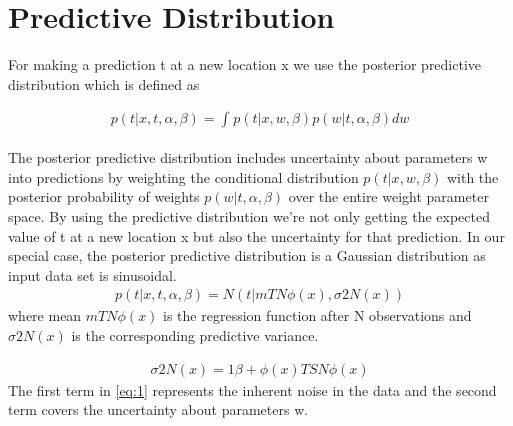 \documentclass[journal,12pt,twocolumn]{IEEEtran}
\begin{document}
\section{Predictive Distribution}
For making a prediction t at a new location x we use the posterior predictive distribution which is defined as

\begin{align}
    p(t|x,t,\alpha,\beta)=\int_{} p(t|x,w,\beta)p(w|t,\alpha,\beta)dw
\end{align}

The posterior predictive distribution includes uncertainty about parameters w into predictions by weighting the conditional distribution $p(t|x,w,\beta)$ with the posterior probability of weights $p(w|t,\alpha,\beta)$ over the entire weight parameter space. By using the predictive distribution we’re not only getting the expected value of t at a new location x but also the uncertainty for that prediction. In our special case, the posterior predictive distribution is a Gaussian distribution as input data set is sinusoidal.
\begin{align}
    p(t|x,t,\alpha,\beta)=N(t|mTN\phi(x),\sigma2N(x))
\end{align}
where mean $mTN\phi(x)$ is the regression function after N observations and $\sigma2N(x)$ is the corresponding predictive variance.


\begin{align}
    \sigma2N(x)=1\beta+\phi(x)TSN\phi(x)\label{eq:1}
\end{align}
The first term in \ref{eq:1} represents the inherent noise in the data and the second term covers the uncertainty about parameters  w.
\end{document}
